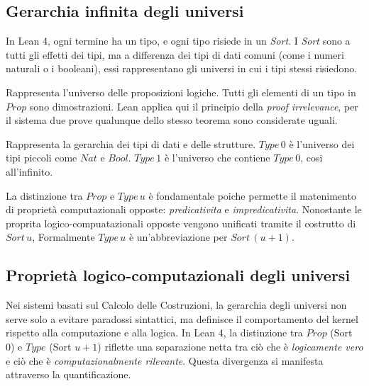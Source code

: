 \subsection{Gerarchia infinita degli universi}
In Lean 4, ogni termine ha un tipo, e ogni tipo risiede in un \emph{Sort}. I \emph{Sort} sono a tutti gli effetti dei tipi, ma a differenza dei 
tipi di dati comuni (come i numeri naturali o i booleani), essi rappresentano gli universi in cui i tipi stessi risiedono. 
\begin{description}[leftmargin=1.5em, style=nextline, font=\bfseries]
    \item 
        [Prop (Sort 0)]
        Rappresenta l'universo delle proposizioni logiche. Tutti gli elementi di un tipo in $Prop$ sono dimostrazioni. Lean applica 
        qui il principio della \emph{proof irrelevance}, per il sistema due prove qualunque dello stesso teorema sono considerate uguali.
    \item 
        [Type u (Sort u+1)]
        Rappresenta la gerarchia dei tipi di dati e delle strutture. $Type\,0$ è l'universo dei tipi 
        piccoli come $Nat$ e $Bool$. $Type\,1$ è l'universo che contiene $Type\,0$, cosi all'infinito.
\end{description}
La distinzione tra $Prop$ e $Type\,u$ è fondamentale poiche permette il matenimento di proprietà computazionali opposte: \emph{predicativita} e 
\emph{impredicativita}. Nonostante le proprita logico-compuatazionali opposte vengono unificati tramite il costrutto di $Sort\,u$, Formalmente 
$Type\,u$ è un'abbreviazione per $Sort\,(u+1)$. 

\subsection{Proprietà logico-computazionali degli universi}
Nei sistemi basati sul Calcolo delle Costruzioni, la gerarchia degli universi non serve solo a evitare paradossi sintattici, ma definisce il 
comportamento del kernel rispetto alla computazione e alla logica. In Lean 4, la distinzione tra $Prop$ (Sort 0) e $Type$ (Sort $u+1$) riflette 
una separazione netta tra ciò che è \emph{logicamente vero} e ciò che è \emph{computazionalmente rilevante}. Questa divergenza si manifesta 
attraverso la quantificazione.

